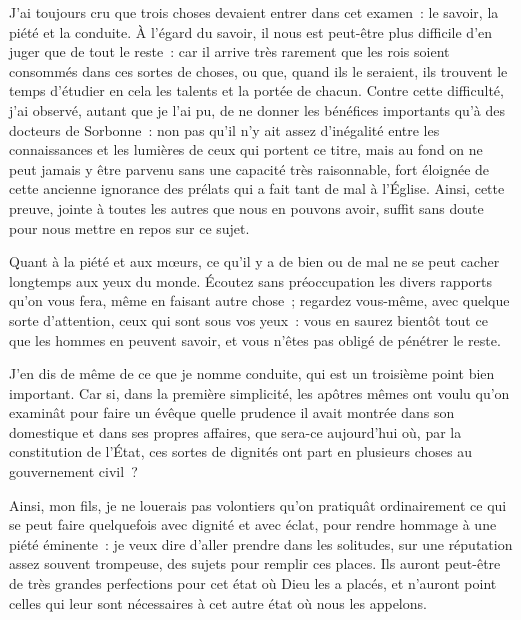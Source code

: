 \documentclass[french,twoside]{book} %
\begin{document}
J’ai toujours cru que trois choses devaient entrer dans cet examen : le savoir, la piété et la conduite. À l’égard du savoir, il nous est peut-être plus difficile d’en juger que de tout le reste : car il arrive très rarement que les rois soient consommés dans ces sortes de choses, ou que, quand ils le seraient, ils trouvent le temps d’étudier en cela les talents et la portée de chacun. Contre cette difficulté, j’ai observé, autant que je l’ai pu, de ne donner les bénéfices importants qu’à des docteurs de Sorbonne : non pas qu’il n’y ait assez d’inégalité entre les connaissances et les lumières de ceux qui portent ce titre, mais au fond on ne peut jamais y être parvenu sans une capacité très raisonnable, fort éloignée de cette ancienne ignorance des prélats qui a fait tant de mal à l’Église. Ainsi, cette preuve, jointe à toutes les autres que nous en pouvons avoir, suffit sans doute pour nous mettre en repos sur ce sujet.\par
Quant à la piété et aux mœurs, ce qu’il y a de bien ou de mal ne se peut cacher longtemps aux yeux du monde. Écoutez sans préoccupation les divers rapports qu’on vous fera, même en faisant autre chose ; regardez vous-même, avec quelque sorte d’attention, ceux qui sont sous vos yeux : vous en saurez bientôt tout ce que les hommes en peuvent savoir, et vous n’êtes pas obligé de pénétrer le reste.\par
J’en dis de même de ce que je nomme conduite, qui est un troisième point bien important. Car si, dans la première simplicité, les apôtres mêmes ont voulu qu’on examinât pour faire un évêque quelle prudence il avait montrée dans son domestique et dans ses propres affaires, que sera-ce aujourd’hui où, par la constitution de l’État, ces sortes de dignités ont part en plusieurs choses au gouvernement civil ?\par
Ainsi, mon fils, je ne louerais pas volontiers qu’on pratiquât ordinairement ce qui se peut faire quelquefois avec dignité et avec éclat, pour rendre hommage à une piété éminente : je veux dire d’aller prendre dans les solitudes, sur une réputation assez souvent trompeuse, des sujets pour remplir ces places. Ils auront peut-être de très grandes perfections pour cet état où Dieu les a placés, et n’auront point celles qui leur sont nécessaires à cet autre état où nous les appelons.\par
\end{document}
